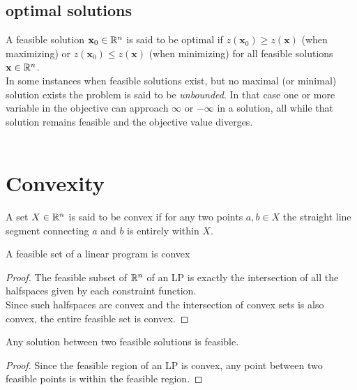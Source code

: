 \subsection{optimal solutions}
A feasible solution $\textbf{x}_0 \in \mathbb{R}^n$ is said to be optimal if $z(\textbf{x}_0) \geq z(\textbf{x})$ (when maximizing) or $z(\textbf{x}_0) \leq z(\textbf{x})$ (when minimizing) for all feasible solutions $\textbf{x} \in \mathbb{R}^n$.\\
In some instances when feasible solutions exist, but no maximal (or minimal) solution exists the problem is said to be \textit{unbounded}. In that case one or more variable in the objective can approach $\infty$ or $-\infty$ in a solution, all while that solution remains feasible and the objective value diverges.\\\\ 
\section{Convexity}
\begin{definition}\label{convex}
A set $X \in \mathbb{R}^n$ is said to be convex if for any two points $a, b \in X$ the straight line segment 
connecting $a$ and $b$ is entirely within $X$.
\end{definition}
\begin{theorem}
A feasible set of a linear program is convex
\begin{proof}
The feasible subset of $\mathbb{R}^n$ of an LP is exactly the intersection of all the halfspaces given by each constraint function. \\
Since such halfspaces are convex and the intersection of convex sets is also convex, the entire feasible set is convex.
\end{proof}
\end{theorem}
\begin{lemma}
Any solution between two feasible solutions is feasible.
\begin{proof}
Since the feasible region of an LP is convex, any point between two feasible points is within the feasible region.
\end{proof}
\end{lemma}
